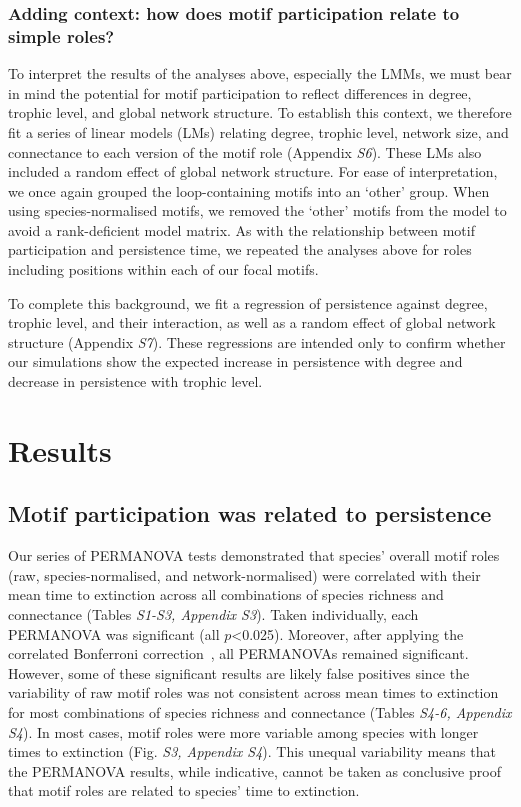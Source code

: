 \documentclass[12pt]{article}
\begin{document}
\begin{spacing}{2.0}
        \subsubsection*{Adding context: how does motif participation relate to simple roles?}

            To interpret the results of the analyses above, especially the LMMs, we must bear in mind the potential for motif participation to reflect differences in degree, trophic level, and global network structure. 
            To establish this context, we therefore fit a series of linear models (LMs) relating degree, trophic level, network size, and connectance to each version of the motif role (Appendix \emph{S6}). 
            These LMs also included a random effect of global network structure.
            For ease of interpretation, we once again grouped the loop-containing motifs into an `other' group. 
            When using species-normalised motifs, we removed the `other' motifs from the model to avoid a rank-deficient model matrix.
            As with the relationship between motif participation and persistence time, we repeated the analyses above for roles including positions within each of our focal motifs.
            
            
            To complete this background, we fit a regression of persistence against degree, trophic level, and their interaction, as well as a random effect of global network structure (Appendix \emph{S7}). 
            These regressions are intended only to confirm whether our simulations show the expected increase in persistence with degree and decrease in persistence with trophic level. 


\section*{Results}
	
    \subsection*{Motif participation was related to persistence}
    
		Our series of PERMANOVA tests demonstrated that species' overall motif roles (raw, species-normalised, and network-normalised) were correlated with their mean time to extinction across all combinations of species richness and connectance (Tables \emph{S1-S3, Appendix S3}). 
        Taken individually, each PERMANOVA was significant (all $p$\textless0.025). Moreover, after applying the correlated Bonferroni correction~\citep{Drezner2016}, all PERMANOVAs remained significant.
		However, some of these significant results are likely false positives since the variability of raw motif roles was not consistent across mean times to extinction for most combinations of species richness and connectance (Tables \emph{S4-6, Appendix S4}). 
        In most cases, motif roles were more variable among species with longer times to extinction (Fig. \emph{S3, Appendix S4}).
        This unequal variability means that the PERMANOVA results, while indicative, cannot be taken as conclusive proof that motif roles are related to species' time to extinction.
    


\end{spacing}
\end{document}
